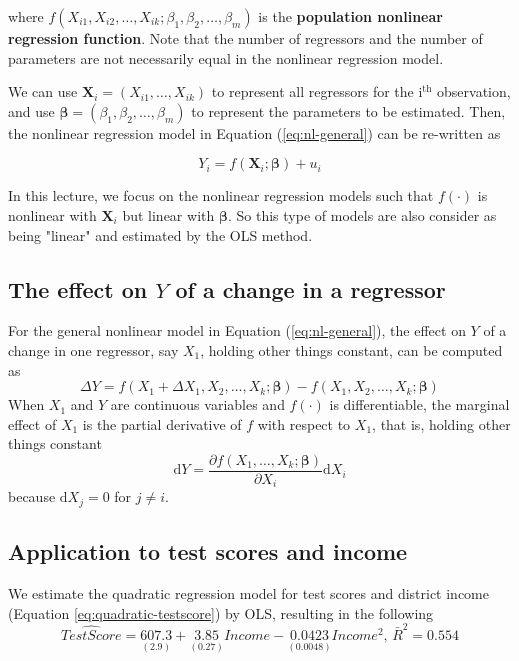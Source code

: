 \documentclass[a4paper,11pt]{article}
\begin{document}
where \(f(X_{i1}, X_{i2}, \ldots, X_{ik}; \beta_1, \beta_2, \ldots,
\beta_m)\) is the \textbf{population nonlinear regression function}. Note that
the number of regressors and the number of parameters are not
necessarily equal in the nonlinear regression model.

We can use \(\mathbf{X}_i = (X_{i1}, \ldots, X_{ik})\) to represent all
regressors for the i\(^{\text{th}}\) observation, and use
\(\boldsymbol{\beta}=(\beta_1, \beta_2, \ldots, \beta_m)\) to represent
the parameters to be estimated. Then, the nonlinear regression model
in Equation (\ref{eq:nl-general}) can be re-written as

\begin{equation}
\label{eq:nl-general-mat}
Y_i = f(\mathbf{X}_i; \boldsymbol{\beta}) + u_i
\end{equation}

In this lecture, we focus on the nonlinear regression models
such that \(f(\cdot)\) is nonlinear with \(\mathbf{X}_i\) but linear with
\(\boldsymbol{\beta}\). So this type of models are also consider as
being "linear" and estimated by the OLS method.


\subsection{The effect on \(Y\) of a change in a regressor}
\label{sec:orgafbe39c}

For the general nonlinear model in Equation (\ref{eq:nl-general}), the
effect on \(Y\) of a change in one regressor, say \(X_1\), holding other
things constant, can be computed as
\begin{equation}
\label{eq:nl-gen-effect}
\Delta Y = f(X_1 + \Delta X_1, X_2, \ldots, X_k; \boldsymbol{\beta}) - f(X_1, X_2, \ldots, X_k; \boldsymbol{\beta})
\end{equation}
When \(X_1\) and \(Y\) are continuous variables and \(f(\cdot)\) is
differentiable, the marginal effect of \(X_1\) is the partial derivative
of \(f\) with respect to \(X_1\), that is, holding other things constant
\[ \mathrm{d}Y = \frac{\partial f(X_1, \ldots, X_k;
\boldsymbol{\beta})}{\partial X_i} \mathrm{d} X_i \]
because \(\mathrm{d}X_j = 0\) for \(j \neq i\). 


\subsection{Application to test scores and income}
\label{sec:orgb8168dd}

We estimate the quadratic regression model for test scores and
district income (Equation \ref{eq:quadratic-testscore}) by OLS,
resulting in the following
\begin{equation}
\label{eq:tsr-income2}
\widehat{TestScore} = \underset{\displaystyle (2.9)}{607.3} +
\underset{\displaystyle (0.27)}{3.85}Income - \underset{\displaystyle (0.0048)}{0.0423}Income^2,\, \bar{R}^2 = 0.554
\end{equation}
\end{document}
